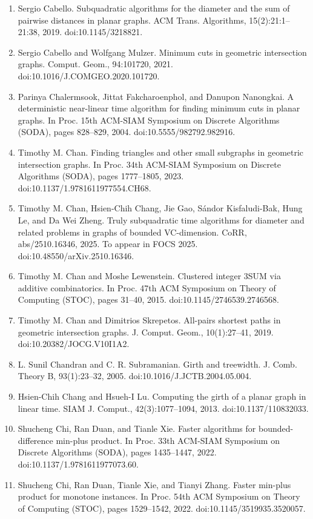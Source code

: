 \documentclass[10pt,a4paper]{article}
\begin{document}
\begin{enumerate}
\item[]  [11]  Sergio Cabello.  Subquadratic algorithms for the diameter and the sum of pairwise distances in planar graphs.  ACM Trans. Algorithms, 15(2):21:1–21:38, 2019.  doi:10.1145/3218821.  
\item[]  [12]  Sergio Cabello and Wolfgang Mulzer.  Minimum cuts in geometric intersection graphs.  Comput. Geom., 94:101720, 2021.  doi:10.1016/J.COMGEO.2020.101720.  
\item[]  [13]  Parinya Chalermsook, Jittat Fakcharoenphol, and Danupon Nanongkai.  A deterministic near-linear time algorithm for finding minimum cuts in planar graphs.  In Proc. 15th ACM-SIAM Symposium on Discrete Algorithms (SODA), pages 828–829, 2004.  doi:10.5555/982792.982916.  
\item[]  [14]  Timothy M. Chan.  Finding triangles and other small subgraphs in geometric intersection graphs.  In Proc. 34th ACM-SIAM Symposium on Discrete Algorithms (SODA), pages 1777–1805, 2023.  doi:10.1137/1.9781611977554.CH68.  
\item[]  [15]  Timothy M. Chan, Hsien-Chih Chang, Jie Gao, Sándor Kisfaludi-Bak, Hung Le, and Da Wei Zheng.  Truly subquadratic time algorithms for diameter and related problems in graphs of bounded VC-dimension.  CoRR, abs/2510.16346, 2025.  To appear in FOCS 2025.  doi:10.48550/arXiv.2510.16346.  
\item[]  [16]  Timothy M. Chan and Moshe Lewenstein.  Clustered integer 3SUM via additive combinatorics.  In Proc. 47th ACM Symposium on Theory of Computing (STOC), pages 31–40, 2015.  doi:10.1145/2746539.2746568.  
\item[]  [17]  Timothy M. Chan and Dimitrios Skrepetos.  All-pairs shortest paths in geometric intersection graphs.  J. Comput. Geom., 10(1):27–41, 2019.  doi:10.20382/JOCG.V10I1A2.  
\item[]  [18]  L. Sunil Chandran and C. R. Subramanian.  Girth and treewidth.  J. Comb. Theory B, 93(1):23–32, 2005.  doi:10.1016/J.JCTB.2004.05.004.  
\item[]  [19]  Hsien-Chih Chang and Hsueh-I Lu.  Computing the girth of a planar graph in linear time.  SIAM J. Comput., 42(3):1077–1094, 2013.  doi:10.1137/110832033.  
\item[]  [20]  Shucheng Chi, Ran Duan, and Tianle Xie.  Faster algorithms for bounded-difference min-plus product.  In Proc. 33th ACM-SIAM Symposium on Discrete Algorithms (SODA), pages 1435–1447, 2022.  doi:10.1137/1.9781611977073.60.  
\item[]  [21]  Shucheng Chi, Ran Duan, Tianle Xie, and Tianyi Zhang.  Faster min-plus product for monotone instances.  In Proc. 54th ACM Symposium on Theory of Computing (STOC), pages 1529–1542, 2022.  doi:10.1145/3519935.3520057.  

\end{enumerate}
\end{document}
